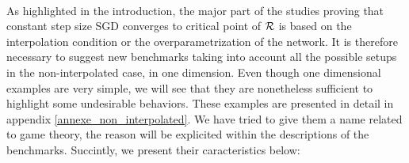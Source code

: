 \documentclass[article,authoryear,jmlmc]{beg_32}             %
\begin{document}
~~\\
As highlighted in the introduction, the major part of the studies proving that constant step size SGD converges to critical point of $\mathcal{R}$ is based on the interpolation condition or
the overparametrization of the network. It is therefore necessary to suggest new benchmarks taking
into account all the possible setups in the non-interpolated case, in one dimension. Even though one dimensional examples are very simple, we will see that they are nonetheless sufficient to highlight some undesirable behaviors.
These examples are presented in detail in appendix \ref{annexe_non_interpolated}. 
We have tried to give them a name related to game theory, the reason will be explicited within the descriptions of the benchmarks. 
Succintly, we present their caracteristics below:
\end{document}
